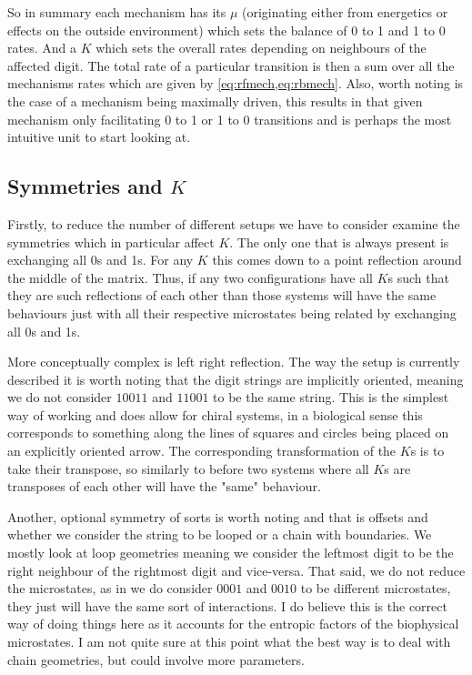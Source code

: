 \documentclass[11pt]{article}
\begin{document}
\begin{tcolorbox}
	So in summary each mechanism has its $\mu$ (originating either from energetics or effects on the outside environment) which sets the balance of 0 to 1 and 1 to 0 rates.
	And a $K$ which sets the overall rates depending on neighbours of the affected digit.
	The total rate of a particular transition is then a sum over all the mechanisms rates which are given by \cref{eq:rfmech,eq:rbmech}.
    Also, worth noting is the case of a mechanism being maximally driven, this results in that given mechanism only facilitating 0 to 1 or 1 to 0 transitions and is perhaps the most intuitive unit to start looking at.
\end{tcolorbox}

\subsection{Symmetries and $K$}
Firstly, to reduce the number of different setups we have to consider examine the symmetries which in particular affect $K$.
The only one that is always present is exchanging all 0s and 1s.
For any $K$ this comes down to a point reflection around the middle of the matrix.
Thus, if any two configurations have all $K$s such that they are such reflections of each other than those systems will have the same behaviours just with all their respective microstates being related by exchanging all 0s and 1s.

More conceptually complex is left right reflection.
The way the setup is currently described it is worth noting that the digit strings are implicitly oriented, meaning we do not consider $10011$ and $11001$ to be the same string.
This is the simplest way of working and does allow for chiral systems, in a biological sense this corresponds to something along the lines of squares and circles being placed on an explicitly oriented arrow.
The corresponding transformation of the $K$s is to take their transpose, so similarly to before two systems where all $K$s are transposes of each other will have the "same" behaviour.

Another, optional symmetry of sorts is worth noting and that is offsets and whether we consider the string to be looped or a chain with boundaries.
We mostly look at loop geometries meaning we consider the leftmost digit to be the right neighbour of the rightmost digit and vice-versa.
That said, we do not reduce the microstates, as in we do consider $0001$ and $0010$ to be different microstates, they just will have the same sort of interactions.
I do believe this is the correct way of doing things here as it accounts for the entropic factors of the biophysical microstates.
I am not quite sure at this point what the best way is to deal with chain geometries, but could involve more parameters.
\end{document}
